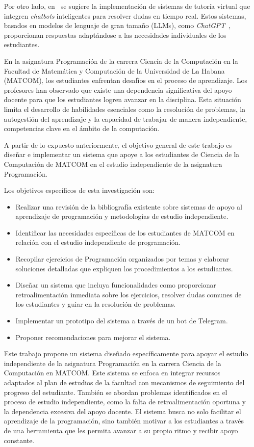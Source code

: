 Por otro lado, en~\cite{dong2025buildaitutoradapt} se sugiere la implementación de sistemas de tutoría virtual que integren \textit{chatbots} inteligentes para resolver dudas en tiempo real. Estos sistemas, basados en modelos de lenguaje de gran tamaño (LLMs), como \textit{ChatGPT}~\cite{chatgpt}, proporcionan respuestas adaptándose a las necesidades individuales de los estudiantes.

En la asignatura Programación de la carrera Ciencia de la Computación en la Facultad de Matemática y Computación de la Universidad de La Habana (\mbox{MATCOM}), los estudiantes enfrentan desafíos en el proceso de aprendizaje. Los profesores han observado que existe una dependencia significativa del apoyo docente para que los estudiantes logren avanzar en la disciplina. Esta situación limita el desarrollo de habilidades esenciales como la resolución de problemas, la autogestión del aprendizaje y la capacidad de trabajar de manera independiente, competencias clave en el ámbito de la computación.

A partir de lo expuesto anteriormente, el objetivo general de este trabajo es diseñar e implementar un sistema que apoye a los estudiantes de Ciencia de la Computación de \mbox{MATCOM} en el estudio independiente de la asignatura Programación.

Los objetivos específicos de esta investigación son:
\begin{itemize}
    \item Realizar una revisión de la bibliografía existente sobre sistemas de apoyo al aprendizaje de programación y metodologías de estudio independiente.
    \item Identificar las necesidades específicas de los estudiantes de \mbox{MATCOM} en relación con el estudio independiente de programación.
    \item Recopilar ejercicios de Programación organizados por temas y elaborar soluciones detalladas que expliquen los procedimientos a los estudiantes.
    \item Diseñar un sistema que incluya funcionalidades como proporcionar retroalimentación inmediata sobre los ejercicios, resolver dudas comunes de los estudiantes y guiar en la resolución de problemas.
    \item Implementar un prototipo del sistema a través de un bot de Telegram.
    \item Proponer recomendaciones para mejorar el sistema.
\end{itemize}

Este trabajo propone un sistema diseñado específicamente para apoyar el estudio independiente de la asignatura Programación en la carrera Ciencia de la Computación en \mbox{MATCOM}. Este sistema se enfoca en integrar recursos adaptados al plan de estudios de la facultad con mecanismos de seguimiento del progreso del estudiante. También se abordan problemas identificados en el proceso de estudio independiente, como la falta de retroalimentación oportuna y la dependencia excesiva del apoyo docente. El sistema busca no solo facilitar el aprendizaje de la programación, sino también motivar a los estudiantes a través de una herramienta que les permita avanzar a su propio ritmo y recibir apoyo constante.

